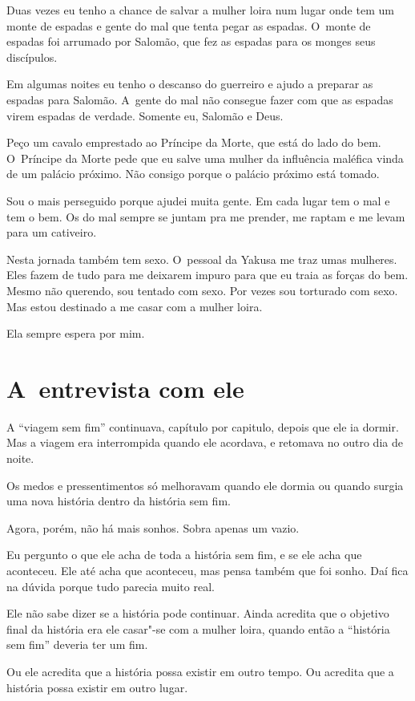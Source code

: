 Duas vezes eu tenho a chance de salvar a mulher loira num lugar onde tem
um monte de espadas e gente do mal que tenta pegar as espadas. O~monte
de espadas foi arrumado por Salomão, que fez as espadas para os monges
seus discípulos.

Em algumas noites eu tenho o descanso do guerreiro e ajudo a preparar as
espadas para Salomão. A~gente do mal não consegue fazer com que as
espadas virem espadas de verdade. Somente eu, Salomão e Deus.

Peço um cavalo emprestado ao Príncipe da Morte, que está do lado do bem.
O~Príncipe da Morte pede que eu salve uma mulher da influência maléfica
vinda de um palácio próximo. Não consigo porque o palácio próximo está
tomado.

Sou o mais perseguido porque ajudei muita gente. Em cada lugar tem o mal
e tem o bem. Os do mal sempre se juntam pra me prender, me raptam e me
levam para um cativeiro.

Nesta jornada também tem sexo. O~pessoal da Yakusa me traz umas
mulheres. Eles fazem de tudo para me deixarem impuro para que eu traia
as forças do bem. Mesmo não querendo, sou tentado com sexo. Por vezes
sou torturado com sexo. Mas estou destinado a me casar com a mulher
loira.

Ela sempre espera por mim.

\section{A~entrevista com ele}

A ``viagem sem fim'' continuava, capítulo por capitulo, depois que ele
ia dormir. Mas a viagem era interrompida quando ele acordava, e retomava
no outro dia de noite.

Os medos e pressentimentos só melhoravam quando ele dormia ou quando
surgia uma nova história dentro da história sem fim.

Agora, porém, não há mais sonhos. Sobra apenas um vazio.

Eu pergunto o que ele acha de toda a história sem fim, e se ele acha que
aconteceu. Ele até acha que aconteceu, mas pensa também que foi sonho.
Daí fica na dúvida porque tudo parecia muito real.

Ele não sabe dizer se a história pode continuar. Ainda acredita que o
objetivo final da história era ele casar"-se com a mulher loira, quando
então a ``história sem fim'' deveria ter um fim.

Ou ele acredita que a história possa existir em outro tempo. Ou acredita
que a história possa existir em outro lugar.

